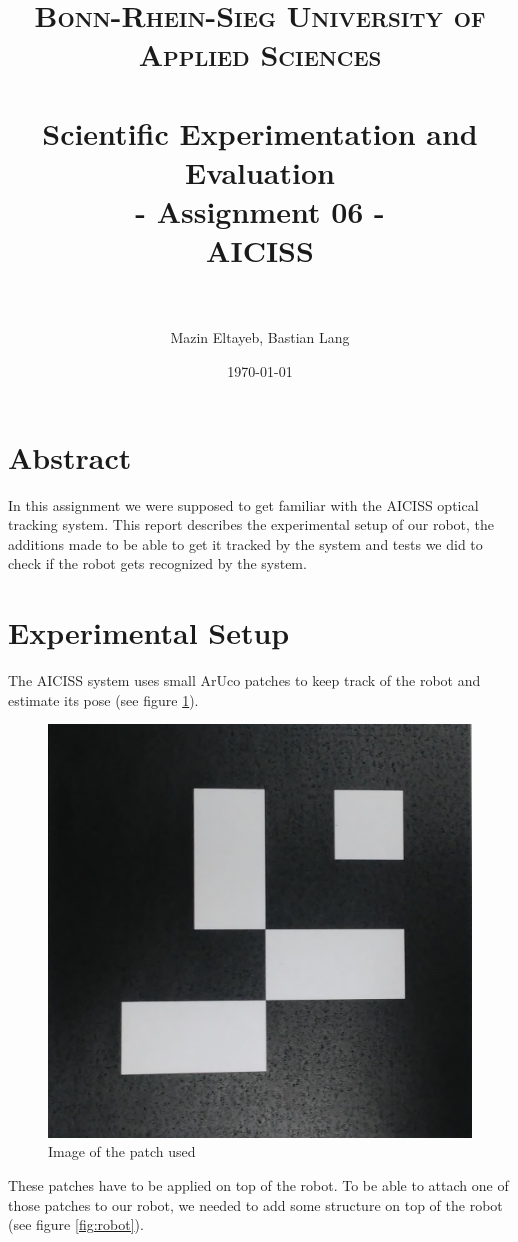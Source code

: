 \documentclass[paper=a4, fontsize=11pt]{scrartcl} %
\title{	
\normalfont \normalsize 
\textsc{Bonn-Rhein-Sieg University of Applied Sciences} \\ [25pt] %
\horrule{0.5pt} \\[0.4cm] %
\huge Scientific Experimentation and Evaluation\\
- Assignment 06 - \\ 
AICISS\\%
\horrule{2pt} \\[0.5cm] %
}
\author{Mazin Eltayeb, Bastian Lang} %
\date{\normalsize\today} %
\numberwithin{equation}{section} %
\numberwithin{figure}{section} %
\numberwithin{table}{section} %
\begin{document}
\maketitle %

\tableofcontents
\newpage

\section{Abstract}
In this assignment we were supposed to get familiar with the AICISS optical tracking system. 
This report describes the experimental setup of our robot, the additions made to be able to get it tracked by the system and tests we did to check if the robot gets recognized by the system.


\section{Experimental Setup}
The AICISS system uses small ArUco patches to keep track of the robot and estimate its pose (see figure \ref{ref:patch}).

\begin{figure}[H]
	\centering
	\includegraphics[width = 0.4\linewidth]{patch.jpg}
	\caption{Image of the patch used}
	\label{ref:patch}
\end{figure}

These patches have to be applied on top of the robot.
To be able to attach one of those patches to our robot, we needed to add some structure on top of the robot (see figure \ref{fig:robot}).
\end{document}
